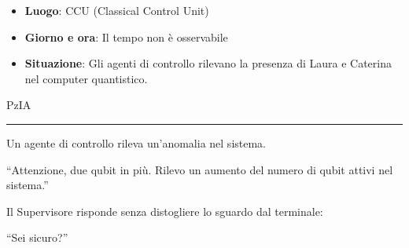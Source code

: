 \begin{center}
\begin{minipage}{0.7\textwidth}
    \centering
    
\end{minipage}
\end{center}
\newpage
\begin{tcolorbox}[colback=gray!5,colframe=gray!80,title=\textbf{Scheda Informativa}]
\begin{itemize}
    \item \textbf{Luogo}: CCU (Classical Control Unit)
    \item \textbf{Giorno e ora}: Il tempo non è osservabile
    \item \textbf{Situazione}: Gli agenti di controllo rilevano la presenza di Laura e Caterina nel computer quantistico.
\end{itemize}
\end{tcolorbox}

\vspace{1em}
\begin{center}PzIA\end{center}
\hrule
\vspace{1em}
Un agente di controllo rileva un'anomalia nel sistema.
\begin{dialogue}
\enquote{Attenzione, due qubit in più. Rilevo un aumento del numero di qubit attivi nel sistema.}
\end{dialogue}
Il Supervisore risponde senza distogliere lo sguardo dal terminale:

\begin{dialogue}
\enquote{Sei sicuro?}
\end{dialogue}

